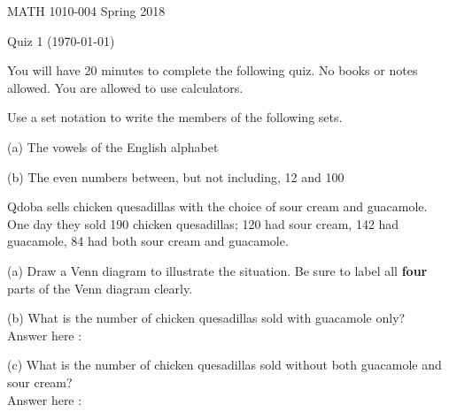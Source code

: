 \documentclass[10.5pt]{article}
\newcounter{choice}
\begin{document}
MATH 1010-004 Spring 2018

Quiz 1 (\today) \hspace{1.9in}  {\underline {\hspace{2.5in}}}
\vspace{2pc}

You will have 20 minutes to complete the following quiz.   No books or notes allowed.  You are allowed to use calculators.
\vspace{1pc}

\begin{problem}{4} Use a set notation to write the members of the following sets.
\begin{description}
\item{(a)} The vowels of the English alphabet
\vspace{1in}
\item{(b)} The even numbers between, but not including, 12 and 100
\vspace{1in}
\end{description}
\end{problem}

\begin{problem}{7} Qdoba sells chicken quesadillas with the choice of sour cream and guacamole. One day they sold 190 chicken quesadillas; 120 had sour cream, 142 had guacamole, 84 had both sour cream and guacamole.
\begin{description}
\item{(a)} Draw a Venn diagram to illustrate the situation.  Be sure to label all {\bf four} parts of the Venn diagram clearly.
\vspace{2.4in}
\item{(b)} What is the number of chicken quesadillas sold with guacamole only? \vspace{0.18 in} \\
 Answer here : \underline{\hspace{1in}} \\
\item{(c)} What is the number of chicken quesadillas sold without both guacamole and sour cream? \vspace{0.2 in} \\
Answer here : \underline{\hspace{1in}}
\end{description}
\end{problem}
\end{document}
